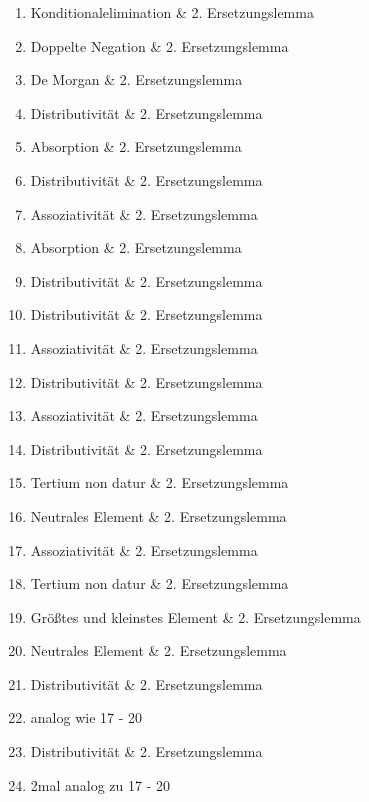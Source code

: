 \documentclass[12pt,a4paper]{scrartcl}
\begin{document}
\begin{enumerate} 
  \item Konditionalelimination \& 2. Ersetzungslemma
  \item Doppelte Negation \& 2. Ersetzungslemma
  \item De Morgan \& 2. Ersetzungslemma
  \item Distributivität \& 2. Ersetzungslemma
  \item Absorption \& 2. Ersetzungslemma
  \item Distributivität \& 2. Ersetzungslemma
  \item Assoziativität \& 2. Ersetzungslemma
  \item Absorption \& 2. Ersetzungslemma
  \item Distributivität \& 2. Ersetzungslemma
  \item Distributivität \& 2. Ersetzungslemma
  \item Assoziativität \& 2. Ersetzungslemma
  \item Distributivität \& 2. Ersetzungslemma
  \item Assoziativität \& 2. Ersetzungslemma
  \item Distributivität \& 2. Ersetzungslemma
  \item Tertium non datur \& 2. Ersetzungslemma
  \item Neutrales Element \& 2. Ersetzungslemma
  \item Assoziativität \& 2. Ersetzungslemma
  \item Tertium non datur \& 2. Ersetzungslemma
  \item Größtes und kleinstes Element \& 2. Ersetzungslemma
  \item Neutrales Element \& 2. Ersetzungslemma
  \item Distributivität \& 2. Ersetzungslemma
  \item analog wie 17 - 20
  \item Distributivität \& 2. Ersetzungslemma
  \item 2mal analog zu 17 - 20
\end{enumerate}


\end{document}
